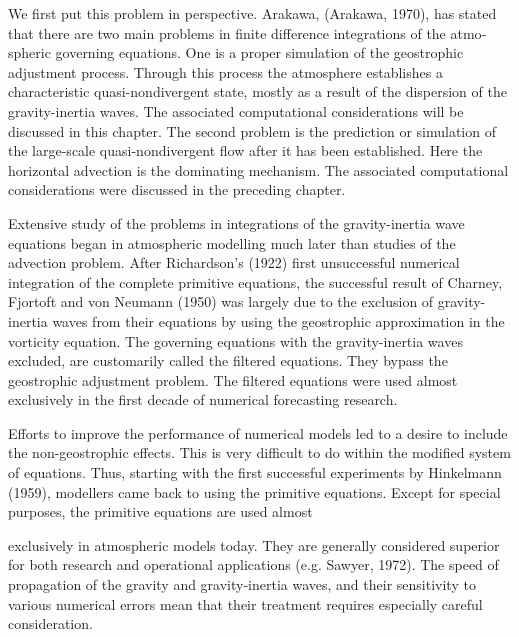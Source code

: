 We first put this problem in perspective. Arakawa, (Arakawa, 1970), has stated that there are two main problems in finite difference integrations of the atmo­spheric governing equations. One is a proper simulation of the geostrophic adjustment process. Through this process the atmosphere establishes a characteristic quasi-nondivergent state, mostly as a result of the dispersion of the gravity-inertia waves. The associated computa­tional considerations will be discussed in this chapter. The second problem is the prediction or simulation of the large-scale quasi-nondivergent flow after it has been established. Here the horizontal advection is the dominat­ing mechanism. The associated computational consi­derations were discussed in the preceding chapter.

Extensive study of the problems in integrations of the gravity-inertia wave equations began in atmospheric modelling much later than studies of the advection problem. After Richardson’s (1922) first unsuccessful numerical integration of the complete primitive equa­tions, the successful result of Charney, Fjortoft and von Neumann (1950) was largely due to the exclusion of gravity-inertia waves from their equations by using the geostrophic approximation in the vorticity equation. The governing equations with the gravity-inertia waves excluded, are customarily called the filtered equations. They bypass the geostrophic adjustment problem. The filtered equations were used almost exclusively in the first decade of numerical forecasting research.

Efforts to improve the performance of numerical models led to a desire to include the non-geostrophic effects. This is very difficult to do within the modified system of equations. Thus, starting with the first success­ful experiments by Hinkelmann (1959), modellers came back to using the primitive equations. Except for special purposes, the primitive equations are used almost

exclusively in atmospheric models today. They are generally considered superior for both research and operational applications (e.g. Sawyer, 1972). The speed of propagation of the gravity and gravity-inertia waves, and their sensitivity to various numerical errors mean that their treatment requires especially careful consideration.

